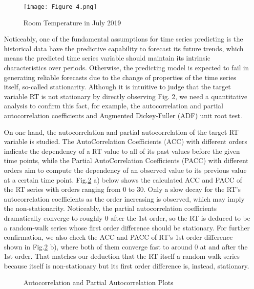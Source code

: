 \documentclass[11pt]{article}
\begin{document}
    \begin{figure}[htbp]
    	\centering
    	\texttt{[image: Figure\_4.png]}
    	\caption{Room Temperature in July 2019}
    	\label{WeeklySeasonality}
    \end{figure}   
    
    Noticeably, one of the fundamental assumptions for time series predicting is the historical data have the predictive capability to forecast its future trends, which means the predicted time series variable should maintain its intrinsic characteristics over periods. Otherwise, the predicting model is expected to fail in generating reliable forecasts due to the change of properties of the time series itself, so-called stationarity. Although it is intuitive to judge that the target variable RT is not stationary by directly observing Fig. 2, we need a quantitative analysis to confirm this fact, for example, the autocorrelation and partial autocorrelation coefficients and Augmented Dickey-Fuller (ADF) unit root test\citep{dickey1981likelihood}.
    
    On one hand, the autocorrelation and partial autocorrelation of the target RT variable is studied. The AutoCorrelation Coefficients (ACC) with different orders indicate the dependency of a RT value to all of its past values before the given time points, while the Partial AutoCorrelation Coefficients (PACC) with different orders aim to compute the dependency of an observed value to its previous value at a certain time point. Fig.\ref{ACC_PACC_Plot} a) below shows the calculated ACC and PACC of the RT series with orders ranging from 0 to 30. Only a slow decay for the RT’s autocorrelation coefficients as the order increasing is observed, which may imply the non-stationarity. Noticeably, the partial autocorrelation coefficients dramatically converge to roughly 0 after the 1st order, so the RT is deduced to be a random-walk series whose first order difference should be stationary. For further confirmation, we also check the ACC and PACC of RT’s 1st order difference shown in Fig.\ref{ACC_PACC_Plot} b), where both of them converge fast to around 0 at and after the 1st order. That matches our deduction that the RT itself a random walk series because itself is non-stationary but its first order difference is, instead, stationary.
    
    \begin{figure}[htbp]
        \centering
        \caption{Autocorrelation and Partial Autocorrelation Plots}
        \label{ACC_PACC_Plot}
    \end{figure}
\end{document}
